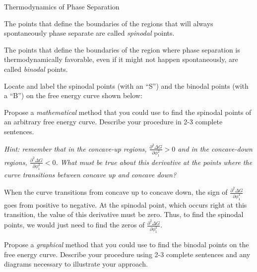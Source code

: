 \begin{activity}{Thermodynamics of Phase Separation}
\clearpage
\begin{infobox}
	The points that define the boundaries of the regions that will always spontaneously phase separate are called \emph{spinodal} points.
	
	The points that define the boundaries of the region where phase separation is thermodynamically favorable, even if it might not happen spontaneously, are called \emph{binodal} points.
\end{infobox}

\begin{ctqs}
	\question Locate and label the spinodal points (with an ``S'') and the binodal points (with a ``B'') on the free energy curve shown below:
	
		\begin{solution}[2.5in]
		\end{solution}
	
	\question Propose a \emph{mathematical} method that you could use to find the spinodal points of an arbitrary free energy curve.  Describe your procedure in 2-3 complete sentences.
	
		\emph{Hint: remember that in the concave-up regions, $\frac{\partial^2\Delta G}{\partial \phi_1^2} > 0$ and in the concave-down regions, $\frac{\partial^2\Delta G}{\partial \phi_1^2} < 0$.  What must be true about this derivative at the points where the curve transitions between concave up and concave down?}
		
		\begin{solution}[2.5in]
		
			When the curve transitions from concave up to concave down, the sign of $\frac{\partial^2\Delta G}{\partial \phi_1^2}$ goes from positive to negative.  At the spinodal point, which occurs right at this transition, the value of this derivative must be zero.  Thus, to find the spinodal points, we would just need to find the zeros of $\frac{\partial^2\Delta G}{\partial \phi_1^2}$.
		
		\end{solution}
		
	\question Propose a \emph{graphical} method that you could use to find the binodal points on the free energy curve.  Describe your procedure using 2-3 complete sentences and any diagrams necessary to illustrate your approach.
		\label{\labelbase:ctq:findbinodal}
		

\end{ctqs}
\end{activity}
